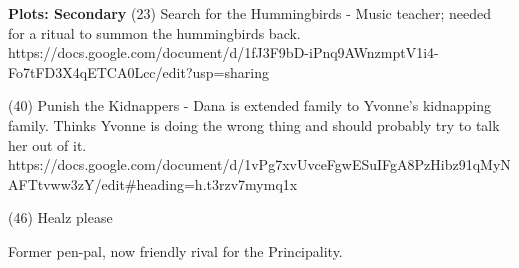 \documentclass[char]{GL2020}
\begin{document}
\textbf{Plots: Secondary}
(23) Search for the Hummingbirds - Music teacher; needed for a ritual to summon the hummingbirds back.
https://docs.google.com/document/d/1fJ3F9bD-iPnq9AWnzmptV1i4-Fo7tFD3X4qETCA0Lcc/edit?usp=sharing	

(40) Punish the Kidnappers - Dana is extended family to Yvonne's kidnapping family. Thinks Yvonne is doing the wrong thing and should probably try to talk her out of it.
https://docs.google.com/document/d/1vPg7xvUvceFgwESuIFgA8PzHibz91qMyNAFTtvww3zY/edit#heading=h.t3rzv7mymq1x

(46) Healz please

\begin{itemz}[Goals]
	\item 
\end{itemz}

\begin{itemz}[Notes]
	\item 
\end{itemz}

\begin{contacts}
	\contact{\cBeetle{}} Former pen-pal, now friendly rival for the Principality.
	\contact{\cYvonne{}} 
\end{contacts}
\end{document}
